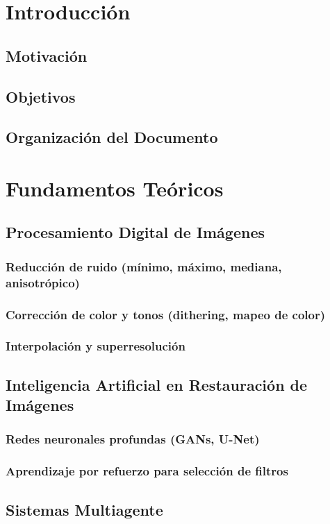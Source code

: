 \documentclass{article}
\begin{document}
\tableofcontents

\section{Introducción}
\subsection{Motivación}
\subsection{Objetivos}
\subsection{Organización del Documento}

\section{Fundamentos Teóricos}
\subsection{Procesamiento Digital de Imágenes}
\subsubsection{Reducción de ruido (mínimo, máximo, mediana, anisotrópico)}
\subsubsection{Corrección de color y tonos (dithering, mapeo de color)}
\subsubsection{Interpolación y superresolución}
\subsection{Inteligencia Artificial en Restauración de Imágenes}
\subsubsection{Redes neuronales profundas (GANs, U-Net)}
\subsubsection{Aprendizaje por refuerzo para selección de filtros}
\subsection{Sistemas Multiagente}
\end{document}
